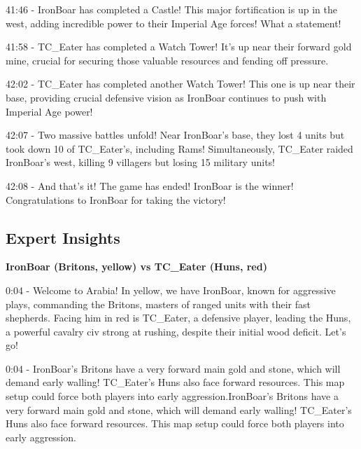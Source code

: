 41:46 - IronBoar has completed a Castle! This major fortification is up in the west, adding incredible power to their Imperial Age forces! What a statement! \par \vspace{1em}

41:58 - TC\_Eater has completed a Watch Tower! It's up near their forward gold mine, crucial for securing those valuable resources and fending off pressure. \par \vspace{1em}

42:02 - TC\_Eater has completed another Watch Tower! This one is up near their base, providing crucial defensive vision as IronBoar continues to push with Imperial Age power! \par \vspace{1em}

42:07 - Two massive battles unfold! Near IronBoar's base, they lost 4 units but took down 10 of TC\_Eater's, including Rams! Simultaneously, TC\_Eater raided IronBoar's west, killing 9 villagers but losing 15 military units! \par \vspace{1em}

42:08 - And that's it! The game has ended! IronBoar is the winner! Congratulations to IronBoar for taking the victory! \par \vspace{1em}

\subsection{Expert Insights}
\textbf{IronBoar (Britons, yellow) vs TC\_Eater (Huns, red)}

0:04 - Welcome to Arabia! In yellow, we have IronBoar, known for aggressive plays, commanding the Britons, masters of ranged units with their fast shepherds. Facing him in red is TC\_Eater, a defensive player, leading the Huns, a powerful cavalry civ strong at rushing, despite their initial wood deficit. Let's go! \par \vspace{1em}

0:04 - IronBoar's Britons have a very forward main gold and stone, which will demand early walling! TC\_Eater's Huns also face forward resources. This map setup could force both players into early aggression.IronBoar's Britons have a very forward main gold and stone, which will demand early walling! TC\_Eater's Huns also face forward resources. This map setup could force both players into early aggression. \par \vspace{1em}


